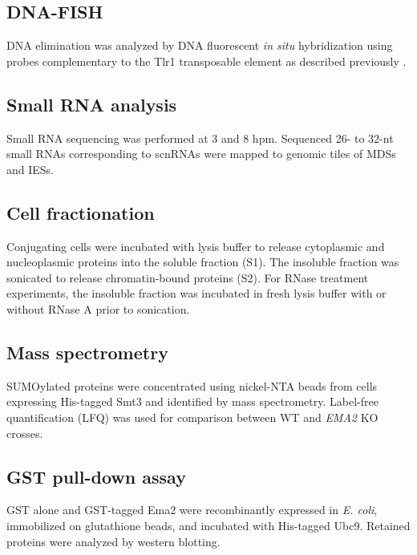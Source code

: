 \documentclass[11pt]{article}
\begin{document}
\subsection{DNA-FISH}
DNA elimination was analyzed by DNA fluorescent \textit{in situ} hybridization using probes complementary to the Tlr1 transposable element as described previously \citep{wuitschick2002}.

\subsection{Small RNA analysis}
Small RNA sequencing was performed at 3 and 8 hpm. Sequenced 26- to 32-nt small RNAs corresponding to scnRNAs \citep{schoeberl2012} were mapped to genomic tiles of MDSs and IESs.

\subsection{Cell fractionation}
Conjugating cells were incubated with lysis buffer to release cytoplasmic and nucleoplasmic proteins into the soluble fraction (S1). The insoluble fraction was sonicated to release chromatin-bound proteins (S2). For RNase treatment experiments, the insoluble fraction was incubated in fresh lysis buffer with or without RNase A prior to sonication.

\subsection{Mass spectrometry}
SUMOylated proteins were concentrated using nickel-NTA beads from cells expressing His-tagged Smt3 and identified by mass spectrometry. Label-free quantification (LFQ) was used for comparison between WT and \textit{EMA2} KO crosses.

\subsection{GST pull-down assay}
GST alone and GST-tagged Ema2 were recombinantly expressed in \textit{E. coli}, immobilized on glutathione beads, and incubated with His-tagged Ubc9. Retained proteins were analyzed by western blotting.



\end{document}
